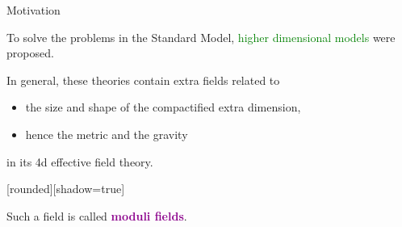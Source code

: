 \documentclass[
  unicode,a4paper,10pt,
  xcolor = {dvipsnames,svgnames},
  hyperref ={colorlinks=true,citecolor=Navy,linkcolor=NavyBlue,urlcolor=purple},
  ja=standard,lualatex
]{beamer}
\begin{document}
\begin{frame}{Motivation}

  To solve the problems in the Standard Model, \textcolor{Green}{higher dimensional models} were proposed.

  \vspace{10pt}

  \pause

  In general, these theories contain extra fields related to
  \begin{itemize}
    \item
          the size and shape of the compactified extra dimension,
    \item
          hence the metric and the gravity
  \end{itemize}
  in its 4d effective field theory.

  \vspace{10pt}

  \pause

  [rounded][shadow=true]

  \begin{block}{}
    \centering
    \large
    Such a field is called \textcolor{DarkMagenta}{\textbf{moduli fields}}.
  \end{block}

\end{frame}
\end{document}
